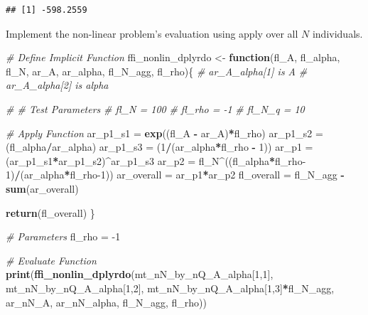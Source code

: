 \documentclass[
]{book}
\newenvironment{Shaded}{\begin{snugshade}}{\end{snugshade}}
\newcommand{\CommentTok}[1]{\textcolor[rgb]{0.56,0.35,0.01}{\textit{#1}}}
\newcommand{\ControlFlowTok}[1]{\textcolor[rgb]{0.13,0.29,0.53}{\textbf{#1}}}
\newcommand{\DecValTok}[1]{\textcolor[rgb]{0.00,0.00,0.81}{#1}}
\newcommand{\KeywordTok}[1]{\textcolor[rgb]{0.13,0.29,0.53}{\textbf{#1}}}
\newcommand{\NormalTok}[1]{#1}
\newcommand{\OperatorTok}[1]{\textcolor[rgb]{0.81,0.36,0.00}{\textbf{#1}}}
\newcommand{\StringTok}[1]{\textcolor[rgb]{0.31,0.60,0.02}{#1}}
\begin{document}
\begin{verbatim}
## [1] -598.2559
\end{verbatim}

Implement the non-linear problem's evaluation using apply over all \(N\) individuals.

\begin{Shaded}
\begin{Highlighting}[]
\CommentTok{\# Define Implicit Function}
\NormalTok{ffi\_nonlin\_dplyrdo \textless{}{-}}\StringTok{ }\ControlFlowTok{function}\NormalTok{(fl\_A, fl\_alpha, fl\_N, ar\_A, ar\_alpha, fl\_N\_agg, fl\_rho)\{}
  \CommentTok{\# ar\_A\_alpha[1] is A}
  \CommentTok{\# ar\_A\_alpha[2] is alpha}

  \CommentTok{\# \# Test Parameters}
  \CommentTok{\# fl\_N = 100}
  \CommentTok{\# fl\_rho = {-}1}
  \CommentTok{\# fl\_N\_q = 10}

  \CommentTok{\# Apply Function}
\NormalTok{  ar\_p1\_s1 =}\StringTok{ }\KeywordTok{exp}\NormalTok{((fl\_A }\OperatorTok{{-}}\StringTok{ }\NormalTok{ar\_A)}\OperatorTok{*}\NormalTok{fl\_rho)}
\NormalTok{  ar\_p1\_s2 =}\StringTok{ }\NormalTok{(fl\_alpha}\OperatorTok{/}\NormalTok{ar\_alpha)}
\NormalTok{  ar\_p1\_s3 =}\StringTok{ }\NormalTok{(}\DecValTok{1}\OperatorTok{/}\NormalTok{(ar\_alpha}\OperatorTok{*}\NormalTok{fl\_rho }\OperatorTok{{-}}\StringTok{ }\DecValTok{1}\NormalTok{))}
\NormalTok{  ar\_p1 =}\StringTok{ }\NormalTok{(ar\_p1\_s1}\OperatorTok{*}\NormalTok{ar\_p1\_s2)}\OperatorTok{\^{}}\NormalTok{ar\_p1\_s3}
\NormalTok{  ar\_p2 =}\StringTok{ }\NormalTok{fl\_N}\OperatorTok{\^{}}\NormalTok{((fl\_alpha}\OperatorTok{*}\NormalTok{fl\_rho}\DecValTok{{-}1}\NormalTok{)}\OperatorTok{/}\NormalTok{(ar\_alpha}\OperatorTok{*}\NormalTok{fl\_rho}\DecValTok{{-}1}\NormalTok{))}
\NormalTok{  ar\_overall =}\StringTok{ }\NormalTok{ar\_p1}\OperatorTok{*}\NormalTok{ar\_p2}
\NormalTok{  fl\_overall =}\StringTok{ }\NormalTok{fl\_N\_agg }\OperatorTok{{-}}\StringTok{ }\KeywordTok{sum}\NormalTok{(ar\_overall)}

  \KeywordTok{return}\NormalTok{(fl\_overall)}
\NormalTok{\}}

\CommentTok{\# Parameters}
\NormalTok{fl\_rho =}\StringTok{ }\DecValTok{{-}1}

\CommentTok{\# Evaluate Function}
\KeywordTok{print}\NormalTok{(}\KeywordTok{ffi\_nonlin\_dplyrdo}\NormalTok{(mt\_nN\_by\_nQ\_A\_alpha[}\DecValTok{1}\NormalTok{,}\DecValTok{1}\NormalTok{],}
\NormalTok{                         mt\_nN\_by\_nQ\_A\_alpha[}\DecValTok{1}\NormalTok{,}\DecValTok{2}\NormalTok{],}
\NormalTok{                         mt\_nN\_by\_nQ\_A\_alpha[}\DecValTok{1}\NormalTok{,}\DecValTok{3}\NormalTok{]}\OperatorTok{*}\NormalTok{fl\_N\_agg,}
\NormalTok{                         ar\_nN\_A, ar\_nN\_alpha, fl\_N\_agg, fl\_rho))}
\end{Highlighting}
\end{Shaded}
\end{document}
